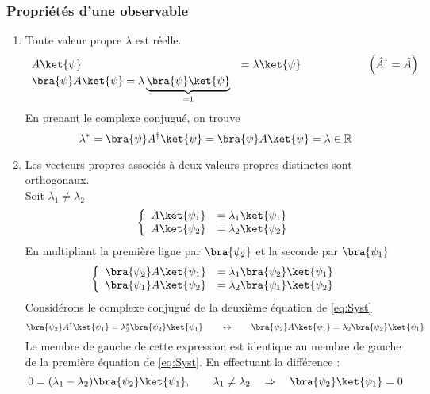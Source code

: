 \subsubsection{Propriétés d'une observable}

\begin{enumerate}
\item Toute valeur propre $\lambda$ est réelle.
\begin{equation}
\begin{array}{ll}
A\ket{\psi} &= \lambda \ket{\psi}\qquad\qquad\qquad \left(\hat{A}^\dagger = 
\hat{A}\right)\\
\bra{\psi}A\ket{\psi} = \lambda\underbrace{\bra{\psi}\ket{\psi}}_{=1}
\end{array}
\end{equation}
En prenant le complexe conjugué, on trouve
\begin{equation}
\lambda^* = \bra{\psi}A^\dagger\ket{\psi} = \bra{\psi}A\ket{\psi}=\lambda\in
\mathbb{R}
\end{equation}

\item Les vecteurs propres associés à deux valeurs propres distinctes sont 
orthogonaux.\\
Soit $\lambda_1\neq\lambda_2$
\begin{equation}
\left\{\begin{array}{ll}
A\ket{\psi_1} &=\lambda_1\ket{\psi_1}\\
A\ket{\psi_2} &=\lambda_2\ket{\psi_2}
\end{array}\right.
\end{equation}
En multipliant la première ligne par $\bra{\psi_2}$ et la seconde par $\bra{\psi_1}$
\begin{equation}
\left\{\begin{array}{ll}
\bra{\psi_2}A\ket{\psi_1} &=\lambda_1\bra{\psi_2}\ket{\psi_1}\\
\bra{\psi_1}A\ket{\psi_2} &=\lambda_2\bra{\psi_1}\ket{\psi_2}
\end{array}\right.
\label{eq:Syst}
\end{equation}
Considérons le complexe conjugué de la deuxième équation de \autoref{eq:Syst} 
\begin{equation}
\bra{\psi_2}A^\dagger\ket{\psi_1} = \lambda_2^*\bra{\psi_2}\ket{\psi_1}\qquad
\leftrightarrow
\qquad\bra{\psi_2}A\ket{\psi_1} = \lambda_2\bra{\psi_2}\ket{\psi_1}
\end{equation}
Le membre de gauche de cette expression est identique au membre de gauche de 
la première équation de \autoref{eq:Syst}. En effectuant la différence :
\begin{equation}
0 = (\lambda_1-\lambda_2)\bra{\psi_2}\ket{\psi_1},\qquad \lambda_1\neq\lambda_2 
\quad\Rightarrow\quad \bra{\psi_2}\ket{\psi_1} = 0
\end{equation}
\end{enumerate}
